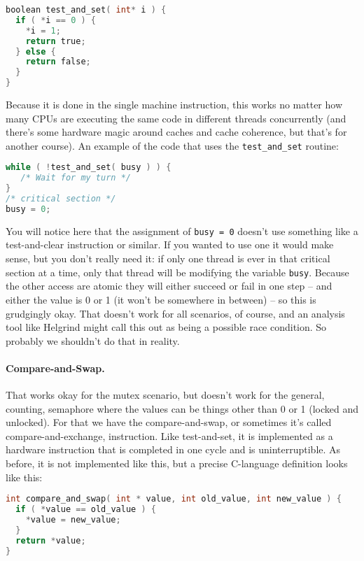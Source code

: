 \begin{lstlisting}[language=C]
boolean test_and_set( int* i ) {
  if ( *i == 0 ) {
    *i = 1;
    return true;
  } else {
    return false;
  }
}
\end{lstlisting}

Because it is done in the single machine instruction, this works no matter how many CPUs are executing the same code in different threads concurrently (and there's some hardware magic around caches and cache coherence, but that's for another course). An example of the code that uses the \texttt{test\_and\_set} routine:

\begin{lstlisting}[language=C]
while ( !test_and_set( busy ) ) {
   /* Wait for my turn */
}
/* critical section */
busy = 0;
\end{lstlisting}

You will notice here that the assignment of \texttt{busy = 0} doesn't use something like a test-and-clear instruction or similar. If you wanted to use one it would make sense, but you don't really need it: if only one thread is ever in that critical section at a time, only that thread will be modifying the variable \texttt{busy}. Because the other access are atomic they will either succeed or fail in one step -- and either the value is 0 or 1 (it won't be somewhere in between) -- so this is grudgingly okay. That doesn't work for all scenarios, of course, and an analysis tool like Helgrind might call this out as being a possible race condition. So probably we shouldn't do that in reality.

\paragraph{Compare-and-Swap.} That works okay for the mutex scenario, but doesn't work for the general, counting, semaphore where the values can be things other than 0 or 1 (locked and unlocked). For that we have the compare-and-swap, or sometimes it's called compare-and-exchange, instruction. Like test-and-set, it is implemented as a hardware instruction that is completed in one cycle and is uninterruptible. As before, it is not implemented like this, but a precise C-language definition looks like this:

\begin{lstlisting}[language=C]
int compare_and_swap( int * value, int old_value, int new_value ) {
  if ( *value == old_value ) {
    *value = new_value;
  }
  return *value;
}
\end{lstlisting}

